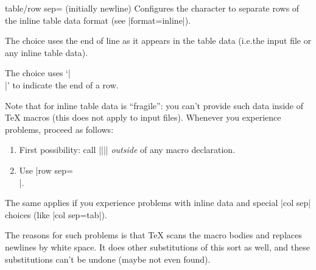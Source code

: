 \begin{pgfplotskey}{table/row sep= (initially newline)}
    Configures the character to separate rows of the inline table data format
    (see |format=inline|).

    The choice  uses the end of line as it appears in the
    table data (i.e.\@ the input file or any inline table data).

    The choice \declaretext{\string\\} uses `|\\|' to indicate the end of a
    row.

    Note that  for inline table data is ``fragile'': you
    can't provide such data inside of \TeX{} macros (this does not apply to
    input files). Whenever you experience problems, proceed as follows:
    \begin{enumerate}
        \item First possibility: call
            |\pgfplotstableread||\yourmacro| \emph{outside} of any
            macro declaration.
        \item Use |row sep=\\|.
    \end{enumerate}
    The same applies if you experience problems with inline data and special
    |col sep| choices (like |col sep=tab|).

    The reasons for such problems is that \TeX{} scans the macro bodies and
    replaces newlines by white space. It does other substitutions of this sort
    as well, and these substitutions can't be undone (maybe not even found).
\end{pgfplotskey}

